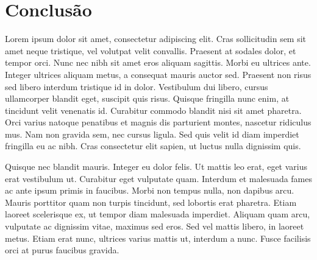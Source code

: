 \section{Conclusão}
 Lorem ipsum dolor sit amet, consectetur adipiscing elit. Cras sollicitudin sem sit amet neque tristique, vel volutpat velit convallis. Praesent at sodales dolor, et tempor orci. Nunc nec nibh sit amet eros aliquam sagittis. Morbi eu ultrices ante. Integer ultrices aliquam metus, a consequat mauris auctor sed. Praesent non risus sed libero interdum tristique id in dolor. Vestibulum dui libero, cursus ullamcorper blandit eget, suscipit quis risus. Quisque fringilla nunc enim, at tincidunt velit venenatis id. Curabitur commodo blandit nisi sit amet pharetra. Orci varius natoque penatibus et magnis dis parturient montes, nascetur ridiculus mus. Nam non gravida sem, nec cursus ligula. Sed quis velit id diam imperdiet fringilla eu ac nibh. Cras consectetur elit sapien, ut luctus nulla dignissim quis.
 
Quisque nec blandit mauris. Integer eu dolor felis. Ut mattis leo erat, eget varius erat vestibulum ut. Curabitur eget vulputate quam. Interdum et malesuada fames ac ante ipsum primis in faucibus. Morbi non tempus nulla, non dapibus arcu. Mauris porttitor quam non turpis tincidunt, sed lobortis erat pharetra. Etiam laoreet scelerisque ex, ut tempor diam malesuada imperdiet. Aliquam quam arcu, vulputate ac dignissim vitae, maximus sed eros. Sed vel mattis libero, in laoreet metus. Etiam erat nunc, ultrices varius mattis ut, interdum a nunc. Fusce facilisis orci at purus faucibus gravida.
